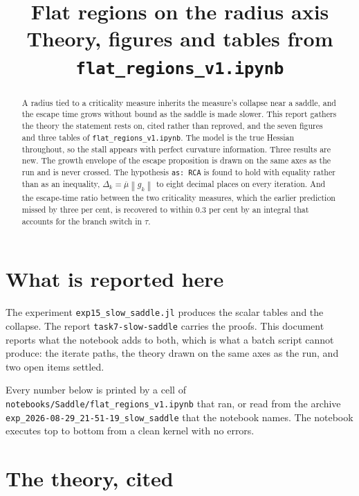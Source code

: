 \documentclass[11pt,a4paper]{article}
\title{Flat regions on the radius axis\\
       \large Theory, figures and tables from \texttt{flat\_regions\_v1.ipynb}}
\author{}
\date{}
\providecommand{\norm}[1]{\left \lVert #1 \right \rVert}
\theoremstyle{definition}
\theoremstyle{remark}
\begin{document}
\maketitle

\begin{abstract}
A radius tied to a criticality measure inherits the measure's collapse near a
saddle, and the escape time grows without bound as the saddle is made slower.
This report gathers the theory the statement rests on, cited rather than
reproved, and the seven figures and three tables of
\texttt{flat\_regions\_v1.ipynb}. The model is the true Hessian throughout, so
the stall appears with perfect curvature information. Three results are new. The
growth envelope of the escape proposition is drawn on the same axes as the run
and is never crossed. The hypothesis \texttt{as: RCA} is found to hold with
equality rather than as an inequality, $\Delta_k = \overline{\mu}\norm{g_k}$ to
eight decimal places on every iteration. And the escape-time ratio between the
two criticality measures, which the earlier prediction missed by three per cent,
is recovered to within $0.3$ per cent by an integral that accounts for the branch
switch in $\tau$.
\end{abstract}

\tableofcontents

\section{What is reported here}\label{sec: scope}

The experiment \texttt{exp15\_slow\_saddle.jl} produces the scalar tables and the
collapse. The report \texttt{task7-slow-saddle} carries the proofs. This document
reports what the notebook adds to both, which is what a batch script cannot
produce: the iterate paths, the theory drawn on the same axes as the run, and two
open items settled.

Every number below is printed by a cell of
\texttt{notebooks/Saddle/flat\_regions\_v1.ipynb} that ran, or read from the
archive \texttt{exp\_2026-08-29\_21-51-19\_slow\_saddle} that the notebook names.
The notebook executes top to bottom from a clean kernel with no errors.

\section{The theory, cited}\label{sec: theory}
\end{document}
